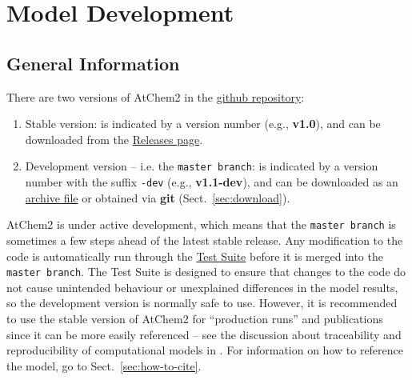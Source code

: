 %
%
%
%

\chapter{Model Development} \label{ch:development}

\section{General Information} \label{sec:general-information}

There are two versions of AtChem2 in the
\href{https://github.com/AtChem/AtChem2}{github repository}:

\begin{enumerate}
\item Stable version: is indicated by a version number (e.g.,
  \textbf{v1.0}), and can be downloaded from the
  \href{https://github.com/AtChem/AtChem2/releases}{Releases page}.
\item Development version -- i.e. the \texttt{master\ branch}: is
  indicated by a version number with the suffix \texttt{-dev} (e.g.,
  \textbf{v1.1-dev}), and can be downloaded as an
  \href{https://github.com/AtChem/AtChem2/archive/master.zip}{archive
    file} or obtained via \textbf{git} (Sect.~\ref{sec:download}).
\end{enumerate}

AtChem2 is under active development, which means that the
\texttt{master\ branch} is sometimes a few steps ahead of the latest
stable release. Any modification to the code is automatically run
through the \hyperref[sec:test-suite]{Test Suite} before it is merged
into the \texttt{master\ branch}. The Test Suite is designed to ensure
that changes to the code do not cause unintended behaviour or
unexplained differences in the model results, so the development
version is normally safe to use. However, it is recommended to use the
stable version of AtChem2 for ``production runs'' and publications
since it can be more easily referenced -- see the discussion about
traceability and reproducibility of computational models in
\citet{sommariva_2020}. For information on how to reference the model,
go to Sect.~\ref{sec:how-to-cite}.

